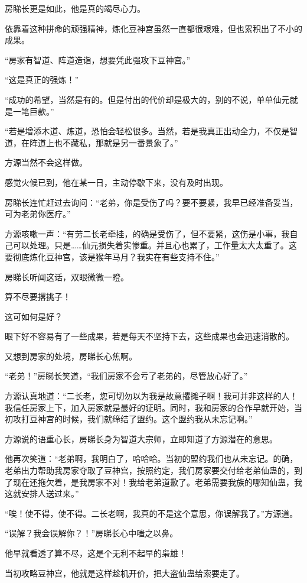 \begin{this_body}
房睇长更是如此，他是真的竭尽心力。

依靠着这种拼命的顽强精神，炼化豆神宫虽然一直都很艰难，但也累积出了不小的成果。

“房家有智道、阵道造诣，想要凭此强攻下豆神宫。”

“这是真正的强炼！”

“成功的希望，当然是有的。但是付出的代价却是极大的，别的不说，单单仙元就是一笔巨款。”

“若是增添木道、炼道，恐怕会轻松很多。当然，若是我真正出动全力，不仅是智道，在阵道上也不藏私，那就是另一番景象了。”

方源当然不会这样做。

感觉火候已到，他在某一日，主动停歇下来，没有及时出现。

房睇长连忙赶过去询问：“老弟，你是受伤了吗？要不要紧，我早已经准备妥当，可为老弟你医疗。”

方源咳嗽一声：“有劳二长老牵挂，的确是受伤了，但不要紧，这伤是小事，我自己可以处理。只是……仙元损失着实惨重。并且心也累了，工作量太大太重了。这要彻底炼化豆神宫，该是猴年马月？我实在有些支持不住。”

房睇长听闻这话，双眼微微一瞪。

算不尽要撂挑子！

这可如何是好？

眼下好不容易有了一些成果，若是每天不坚持下去，这些成果也会迅速消散的。

又想到房家的处境，房睇长心焦啊。

“老弟！”房睇长笑道，“我们房家不会亏了老弟的，尽管放心好了。”

方源认真地道：“二长老，您可切勿以为我是故意撂摊子啊！我可并非这样的人！我信任房家上下，加入房家就是最好的证明。同时，我和房家的合作早就开始，当初攻打豆神宫的时候，我们就缔结了盟约。这个盟约我从未忘记啊。”

方源说的语重心长，房睇长身为智道大宗师，立即知道了方源潜在的意思。

他再次笑道：“老弟啊，我明白了，哈哈哈。当初的盟约我们也从未忘记。的确，老弟出力帮助我房家夺取了豆神宫，按照约定，我们房家要交付给老弟仙蛊的，到了现在还拖欠着，是我房家不对！我给老弟道歉了。老弟需要我族的哪知仙蛊，我这就安排人送过来。”

“唉！使不得，使不得。二长老啊，我真的不是这个意思，你误解我了。”方源道。

“误解？我会误解你？！”房睇长心中嗤之以鼻。

他早就看透了算不尽，这是个无利不起早的枭雄！

当初攻略豆神宫，他就是这样趁机开价，把大盗仙蛊给索要走了。


\end{this_body}
